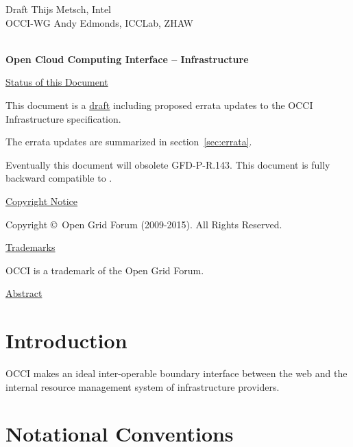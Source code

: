 \documentclass[10pt,a4paper]{article}
\begin{document}
\thispagestyle{empty}

Draft \hfill  Thijs Metsch, Intel\\
OCCI-WG \hfill  Andy Edmonds, ICCLab, ZHAW\\
\\

\vspace*{0.5in}

\begin{Large}
\textbf{Open Cloud Computing Interface -- Infrastructure}
\end{Large}

\vspace*{0.5in}

\underline{Status of this Document}

% 

This document is a \underline{draft} including proposed errata updates
to the OCCI Infrastructure \cite{occi:infrastructure} specification.

The errata updates are summarized in section~\ref{sec:errata}.

Eventually this document will obsolete GFD-P-R.143. This document is
fully backward compatible to \cite{occi:infrastructure}.

\underline{Copyright Notice}

Copyright \copyright ~Open Grid Forum (2009-2015). All Rights
Reserved.

\underline{Trademarks}

OCCI is a trademark of the Open Grid Forum.

\underline{Abstract}



\newpage
\tableofcontents
\newpage

\section{Introduction}


OCCI makes an ideal inter-operable boundary interface between the web
and the internal resource management system of infrastructure
providers.

\section{Notational Conventions}

\end{document}
